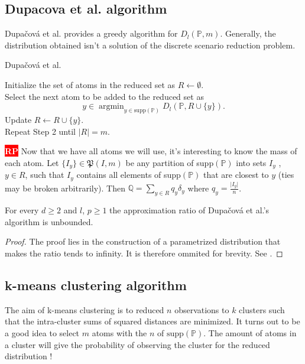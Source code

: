 \documentclass{amsart}
\newcommand{\argmin}{\mathop{\arg\min}}
\newcommand{\nb}[3]{
		{\colorbox{#2}{\bfseries\sffamily\tiny\textcolor{white}{#1}}}
		{\textcolor{#2}{\text{$\blacktriangleright$}{\textcolor{#2}{#3}}\text{$\blacktriangleleft$}}}}
\newcommand{\rp}[1]{\nb{RP}{red}{#1}}
\begin{document}
\subsection{Dupacova et al. algorithm}
Dupačová et al. \cite{dupacova_scenario_2003} provides a greedy algorithm for $D_l\left(\mathbb{P},m\right)$. Generally, the distribution obtained isn't a solution of the discrete scenario reduction problem.
\begin{algorithm}
  \caption{Dupačová et al.}
  Initialize the set of atoms in the reduced set as $R\gets \emptyset.$ \\ Select the next atom to be added to the reduced set as $$ y\in\argmin_{y\in \text{supp}\left(\mathbb{P}\right)}D_l\left(\mathbb{P},R\cup\{y\}\right).
  $$
  Update $R\gets R\cup \{y\}$.\\ Repeat Step 2 until $\lvert R\rvert=m$.
\end{algorithm}
\rp{box is too large, don't know how to deal with that}
Now that we have all atoms we will use, it's interesting to know the mass of each atom. Let $\{I_y\}\in \mathfrak{P}\left(I,m\right)$ be any partition of supp$\left(\mathbb{P}\right)$ into sets $I_y$ , $y\in R$, such that $I_y$ contains all elements of supp$\left(\mathbb{P}\right)$ that are closest to $y$ (ties may be broken arbitrarily). Then $\mathbb{Q}=\sum_{y\in R}q_y\delta_y$ where $q_y=\frac{\lvert I_y\rvert}{n}$.

\begin{proposition}
    For every $d\geq2$ and $l$, $p\geq1$ the approximation ratio of Dupačová et al.'s algorithm is unbounded.
\end{proposition}
\begin{proof}
    The proof lies in the construction of a parametrized distribution that makes the ratio tends to infinity. It is therefore ommited for brevity. See \cite[Theorem 7]{rujeerapaiboon_scenario_2022}.
\end{proof}

\subsection{k-means clustering algorithm}
The aim of k-means clustering is to reduced $n$ observations to $k$ clusters such that the intra-cluster sums of squared distances are minimized. It turns out to be a good idea to select $m$ atoms with the $n$ of $\text{supp}\left(\mathbb{P}\right)$. The amount of atoms in a cluster will give the probability of observing the cluster for the reduced distribution !
\end{document}

